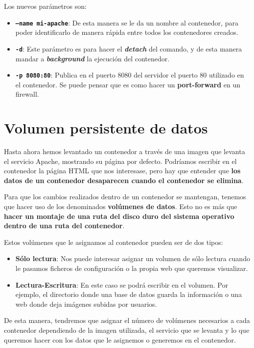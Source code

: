Los nuevos parámetros son:
\begin{itemize}
    \item \textbf{\texttt{--name mi-apache}}: De esta manera se le da un nombre al contenedor, para poder identificarlo de manera rápida entre todos los contenedores creados.
    \item \textbf{\texttt{-d}}: Este parámetro es para hacer el \textbf{\textit{detach}} del comando, y de esta manera mandar a \textbf{\textit{background}} la ejecución del contenedor.
    \item \textbf{\texttt{-p 8080:80}}: Publica en el puerto 8080 del servidor el puerto 80 utilizado en el contenedor. Se puede pensar que es como hacer un \textbf{port-forward} en un firewall.
\end{itemize}


\hypertarget{volumen_persistente_datos}{}
\section{Volumen persistente de datos}
Hasta ahora hemos levantado un contenedor a través de una imagen que levanta el servicio Apache, mostrando su página por defecto. Podríamos escribir en el contenedor la página HTML que nos interesase, pero hay que entender que \textbf{los datos de un contenedor desaparecen cuando el contenedor se elimina}.

Para que los cambios realizados dentro de un contenedor se mantengan, tenemos que hacer uso de los denominados \textbf{volúmenes de datos}. Esto no es más que \textbf{hacer un montaje de una ruta del disco duro del sistema operativo dentro de una ruta del contenedor}.


Estos volúmenes que le asignamos al contenedor pueden ser de dos tipos:
\begin{itemize}
    \item \textbf{Sólo lectura}: Nos puede interesar asignar un volumen de sólo lectura cuando le pasamos ficheros de configuración o la propia web que queremos visualizar.
    \item \textbf{Lectura-Escritura}: En este caso se podrá escribir en el volumen. Por ejemplo, el directorio donde una base de datos guarda la información o una web donde deja imágenes subidas por usuarios.
\end{itemize}

De esta manera, tendremos que asignar el número de volúmenes necesarios a cada contenedor dependiendo de la imagen utilizada, el servicio que se levanta y lo que queremos hacer con los datos que le asignemos o generemos en el contenedor.

